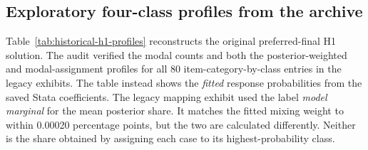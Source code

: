 \subsection{Exploratory four-class profiles from the archive}
Table~\ref{tab:historical-h1-profiles} reconstructs the original preferred-final H1 solution. The audit verified the modal counts and both the posterior-weighted and modal-assignment profiles for all 80 item-category-by-class entries in the legacy exhibits. The table instead shows the \emph{fitted} response probabilities from the saved Stata coefficients. The legacy mapping exhibit used the label \emph{model marginal} for the mean posterior share. It matches the fitted mixing weight to within 0.00020 percentage points, but the two are calculated differently. Neither is the share obtained by assigning each case to its highest-probability class.

